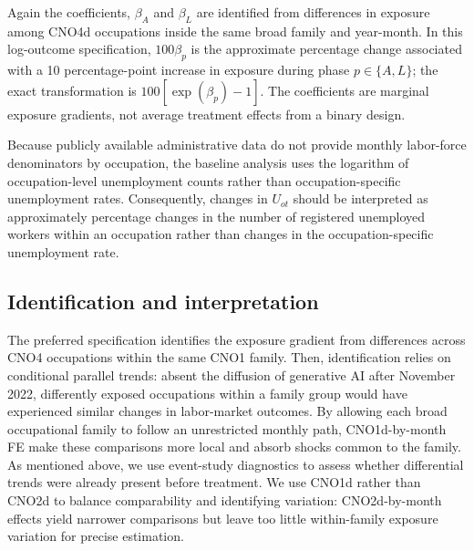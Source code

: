 Again the coefficients, \(\beta_A\) and \(\beta_L\) are identified from differences in exposure among CNO4d occupations inside the same broad family and year-month. In this log-outcome specification, \(100\beta_p\) is the approximate percentage change associated with a 10 percentage-point increase in exposure during phase \(p\in\{A,L\}\); the exact transformation is \(100[\exp(\beta_p)-1]\). The coefficients are marginal exposure gradients, not average treatment effects from a binary design.

Because publicly available administrative data do not provide monthly labor-force denominators by occupation, the baseline analysis uses the logarithm of occupation-level unemployment counts rather than occupation-specific unemployment rates. Consequently, changes in $U_{ot}$ should be interpreted as approximately percentage changes in the number of registered unemployed workers within an occupation rather than changes in the occupation-specific unemployment rate.


\subsection{Identification and interpretation}
\label{sec:identification}

The preferred specification identifies the exposure gradient from differences across CNO4 occupations within the same CNO1 family. Then, identification relies on conditional parallel trends: absent the diffusion of generative AI after November 2022, differently exposed occupations within a family group would have experienced similar changes in labor-market outcomes. By allowing each broad occupational family to follow an unrestricted monthly path, CNO1d-by-month FE make these comparisons more local and absorb shocks common to the family. As mentioned above, we use event-study diagnostics to assess whether differential trends were already present before treatment. We use CNO1d rather than CNO2d to balance comparability and identifying variation: CNO2d-by-month effects yield narrower comparisons but leave too little within-family exposure variation for precise estimation.


